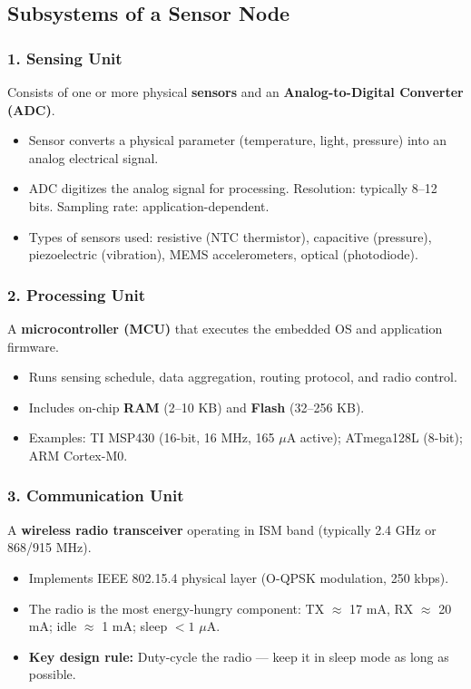 \documentclass[12pt,a4paper]{article}
\begin{document}
\subsection{Subsystems of a Sensor Node}

\subsubsection*{1. Sensing Unit}
Consists of one or more physical \textbf{sensors} and an \textbf{Analog-to-Digital Converter (ADC)}.
\begin{itemize}[leftmargin=*, itemsep=2pt]
  \item Sensor converts a physical parameter (temperature, light, pressure) into an analog electrical signal.
  \item ADC digitizes the analog signal for processing. Resolution: typically 8--12 bits. Sampling rate: application-dependent.
  \item Types of sensors used: resistive (NTC thermistor), capacitive (pressure), piezoelectric (vibration), MEMS accelerometers, optical (photodiode).
\end{itemize}

\subsubsection*{2. Processing Unit}
A \textbf{microcontroller (MCU)} that executes the embedded OS and application firmware.
\begin{itemize}[leftmargin=*, itemsep=2pt]
  \item Runs sensing schedule, data aggregation, routing protocol, and radio control.
  \item Includes on-chip \textbf{RAM} (2--10 KB) and \textbf{Flash} (32--256 KB).
  \item Examples: TI MSP430 (16-bit, 16 MHz, 165 $\mu$A active); ATmega128L (8-bit); ARM Cortex-M0.
\end{itemize}

\subsubsection*{3. Communication Unit}
A \textbf{wireless radio transceiver} operating in ISM band (typically 2.4 GHz or 868/915 MHz).
\begin{itemize}[leftmargin=*, itemsep=2pt]
  \item Implements IEEE 802.15.4 physical layer (O-QPSK modulation, 250 kbps).
  \item The radio is the most energy-hungry component: TX $\approx$ 17 mA, RX $\approx$ 20 mA; idle $\approx$ 1 mA; sleep $< 1$ $\mu$A.
  \item \textbf{Key design rule:} Duty-cycle the radio --- keep it in sleep mode as long as possible.
\end{itemize}
\end{document}
